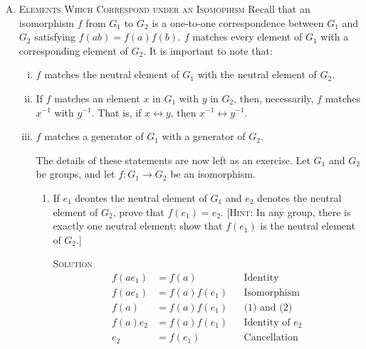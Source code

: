 \documentclass[twoside]{amsart}
\newcommand{\solution}{\textsc{Solution}\xspace}
\newcommand{\blank}{\vspace{5pt}}
\begin{document}
\begin{enumerate}[A.]
\begin{enumerate}[1]
   \end{enumerate}

	\item \textsc{Elements Which Correspond under an Isomophism}
	Recall that an isomorphism $f$ from $G_1$ to $G_2$ is a one-to-one
	correspondence between $G_1$ and $G_2$ satisfying $f(ab)=f(a)f(b)$.
	$f$ matches every element of $G_1$ with a corresponding element of
	$G_2$. It is important to note that:
	\blank

	\begin{enumerate}[(i)]
		\item $f$ matches the neutral element of $G_1$ with the neutral
		element of $G_2$.

		\item If $f$ matches an element $x$ in $G_1$ with $y$ in $G_2$,
		then, necessarily, $f$ matches $x^{-1}$ with $y^{-1}$.
		That is, if $x \leftrightarrow y$, then $x^{-1} \leftrightarrow
		y^{-1}$.

		\item $f$ matches a generator of $G_1$ with a generator of $G_2$.

      \blank
      \begin{center}
		\end{center}
		\blank

		The details of these statements are now left as an exercise. Let 
		$G_1$ and $G_2$ be groups, and let $f : G_1 \to G_2$ be an 
		isomorphism.

		\begin{enumerate}[1.]
			\item If $e_1$ deontes the neutral element of $G_1$ and $e_2$
			denotes the neutral element of $G_2$, prove that $f(e_1)=e_2$.
			[\textsc{Hint}: In any group, there is exactly one neutral
			element; show that $f(e_1)$ is the neutral element of $G_2$.]

			\setcounter{equation}{0}
			\blank \noindent \solution 
			\begin{align}
			   f(ae_1) &= f(a)   && \text{Identity}\\
				f(ae_1) &= f(a)f(e_1) && \text{Isomorphism}\\
				f(a)    &= f(a)f(e_1) && \text{(1) and (2)}\\
				f(a)e_2 &= f(a)f(e_1) && \text{Identity of $e_2$}\\
				    e_2 &= f(e_1)     && \text{Cancellation}
			\end{align}


\end{enumerate}
\end{enumerate}
\end{enumerate}
\end{document}
